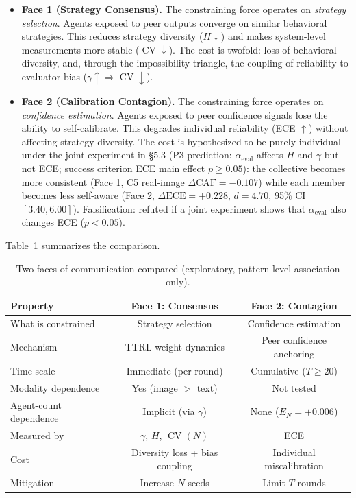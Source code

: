 \documentclass[11pt]{article}
\DeclareMathOperator{\CV}{CV}
\begin{document}
\begin{itemize}[leftmargin=*,nosep]
 \item \textbf{Face 1 (Strategy Consensus).} The constraining force operates on \textit{strategy selection}. Agents exposed to peer outputs converge on similar behavioral strategies. This reduces strategy diversity ($H \downarrow$) and makes system-level measurements more stable ($\CV \downarrow$). The cost is twofold: loss of behavioral diversity, and, through the impossibility triangle, the coupling of reliability to evaluator bias ($\gamma \uparrow \Rightarrow \CV \downarrow$).
 \item \textbf{Face 2 (Calibration Contagion).} The constraining force operates on \textit{confidence estimation}. Agents exposed to peer confidence signals lose the ability to self-calibrate. This degrades individual reliability (ECE $\uparrow$) without affecting strategy diversity. The cost is hypothesized to be purely individual under the joint experiment in §5.3 (P3 prediction: $\alpha_{\text{eval}}$ affects $H$ and $\gamma$ but not ECE; success criterion ECE main effect $p \geq 0.05$): the collective becomes more consistent (Face 1, C5 real-image $\Delta\text{CAF} = -0.107$) while each member becomes less self-aware (Face 2, $\Delta\text{ECE} = +0.228$, $d = 4.70$, 95\% CI $[3.40, 6.00]$). Falsification: refuted if a joint experiment shows that $\alpha_{\text{eval}}$ also changes ECE ($p < 0.05$).
\end{itemize}

Table~\ref{tab:comparison} summarizes the comparison.

\begin{table}[H]
\centering
\caption{Two faces of communication compared (exploratory, pattern-level association only).}
\label{tab:comparison}
\begin{tabular}{@{}lcc@{}}
\toprule
\textbf{Property} & \textbf{Face 1: Consensus} & \textbf{Face 2: Contagion} \\
\midrule
What is constrained  & Strategy selection & Confidence estimation \\
Mechanism            & TTRL weight dynamics & Peer confidence anchoring \\
Time scale           & Immediate (per-round) & Cumulative ($T \geq 20$) \\
Modality dependence  & Yes (image $>$ text) & Not tested \\
Agent-count dependence & Implicit (via $\gamma$) & None ($E_N = +0.006$) \\
Measured by          & $\gamma$, $H$, $\CV(N)$ & ECE \\
Cost                 & Diversity loss + bias coupling & Individual miscalibration \\
Mitigation           & Increase $N$ seeds & Limit $T$ rounds \\
\bottomrule
\end{tabular}
\end{table}
\end{document}
